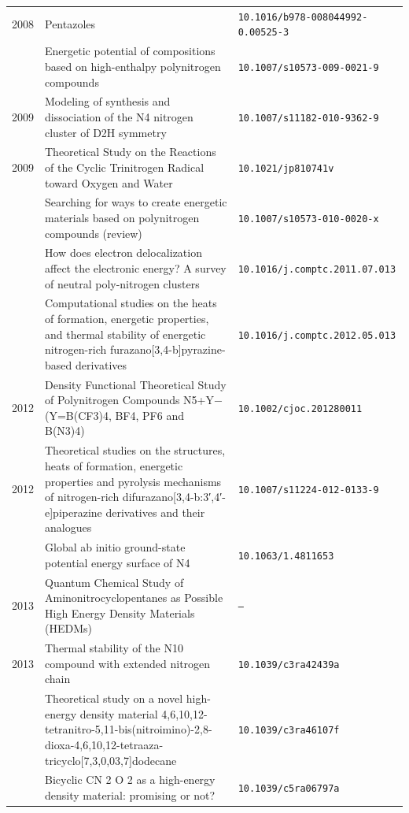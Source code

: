 \begin{longtable}{@{}p{1.0cm}p{10.5cm}p{3.5cm}@{}}
2008 & Pentazoles & \small\texttt{10.1016/b978-008044992-0.00525-3} \\
\addlinespace
2009 & Energetic potential of compositions based on high-enthalpy polynitrogen compounds & \small\texttt{10.1007/s10573-009-0021-9} \\
2009 & Modeling of synthesis and dissociation of the N4 nitrogen cluster of D2H symmetry & \small\texttt{10.1007/s11182-010-9362-9} \\
2009 & Theoretical Study on the Reactions of the Cyclic Trinitrogen Radical toward Oxygen and Water & \small\texttt{10.1021/jp810741v} \\
\addlinespace
2010 & Searching for ways to create energetic materials based on polynitrogen compounds (review) & \small\texttt{10.1007/s10573-010-0020-x} \\
\addlinespace
2011 & How does electron delocalization affect the electronic energy? A survey of neutral poly-nitrogen clusters & \small\texttt{10.1016/j.comptc.2011.07.013} \\
\addlinespace
2012 & Computational studies on the heats of formation, energetic properties, and thermal stability of energetic nitrogen-rich furazano[3,4-b]pyrazine-based derivatives & \small\texttt{10.1016/j.comptc.2012.05.013} \\
2012 & Density Functional Theoretical Study of Polynitrogen Compounds N5+Y− (Y=B(CF3)4, BF4, PF6 and B(N3)4) & \small\texttt{10.1002/cjoc.201280011} \\
2012 & Theoretical studies on the structures, heats of formation, energetic properties and pyrolysis mechanisms of nitrogen-rich difurazano[3,4-b:3′,4′-e]piperazine derivatives and their analogues & \small\texttt{10.1007/s11224-012-0133-9} \\
\addlinespace
2013 & Global ab initio ground-state potential energy surface of N4 & \small\texttt{10.1063/1.4811653} \\
2013 & Quantum Chemical Study of Aminonitrocyclopentanes as Possible High Energy Density Materials (HEDMs) & \small\texttt{--} \\
2013 & Thermal stability of the N10 compound with extended nitrogen chain & \small\texttt{10.1039/c3ra42439a} \\
\addlinespace
2014 & Theoretical study on a novel high-energy density material 4,6,10,12-tetranitro-5,11-bis(nitroimino)-2,8-dioxa-4,6,10,12-tetraaza-tricyclo[7,3,0,03,7]dodecane & \small\texttt{10.1039/c3ra46107f} \\
\addlinespace
2015 & Bicyclic CN 2 O 2 as a high-energy density material: promising or not? & \small\texttt{10.1039/c5ra06797a} \\

\end{longtable}
